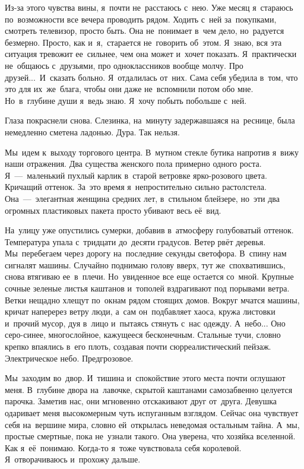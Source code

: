 Из-за этого чувства вины, я~почти не~расстаюсь с~нею.
Уже месяц я~стараюсь по~возможности все вечера проводить рядом.
Ходить с~ней за~покупками, смотреть телевизор, просто быть.
Она не~понимает в~чем дело, но~радуется безмерно.
Просто, как и~я,~старается не~говорить об~этом.
Я~знаю, вся эта ситуация тревожит ее~сильнее, чем она может и~хочет показать.
Я~практически не~общаюсь с~друзьями, про одноклассников вообще молчу.
Про друзей...~И~сказать больно.
Я~отдалилась от~них.
Сама себя убедила в~том, что это для их~же~блага, чтобы они даже не~вспомнили потом обо мне.
Но~в~глубине души я~ведь знаю.
Я~хочу побыть побольше с~ней.

Глаза покраснели снова.
Слезинка, на~минуту задержавшаяся на~реснице, была немедленно сметена ладонью.
Дура.
Так нельзя.

Мы~идем к~выходу торгового центра.
В~мутном стекле бутика напротив я~вижу наши отражения.
Два существа женского пола примерно одного роста.
Я~---~маленький пухлый карлик в~старой ветровке ярко-розового цвета.
Кричащий оттенок.
За~это время я~непростительно сильно растолстела.
Она~---~элегантная женщина средних лет, в~стильном блейзере, но~эти два огромных пластиковых пакета просто убивают весь её~вид.

На~улицу уже опустились сумерки, добавив в~атмосферу голубоватый оттенок.
Температура упала с~тридцати до~десяти градусов.
Ветер рвёт деревья.
Мы~перебегаем через дорогу на~последние секунды светофора.
В~спину нам сигналят машины.
Случайно поднимаю голову вверх, тут же~спохватившись, снова втягиваю ее~в~плечи.
Но~увиденное все еще остается со~мной.
Крупные сочные зеленые листья каштанов и~тополей вздрагивают под порывами ветра.
Ветки нещадно хлещут по~окнам рядом стоящих домов.
Вокруг мчатся машины, кричат наперерез ветру люди, а~сам он~подбавляет хаоса, кружа листовки и~прочий мусор, дуя в~лицо и~пытаясь стянуть с~нас одежду.
А~небо... Оно серо-синее, многослойное, кажущееся бесконечным.
Стальные тучи, словно крепко впаялись в~его плоть, создавая почти сюрреалистический пейзаж.
Электрическое небо.
Предгрозовое.

Мы~заходим во~двор.
И~тишина и~спокойствие этого места почти оглушают меня.
В~глубине двора на~лавочке, скрытой каштанами самозабвенно целуется парочка.
Заметив нас, они мгновенно отскакивают друг от~друга.
Девушка одаривает меня высокомерным чуть испуганным взглядом.
Сейчас она чувствует себя на~вершине мира, словно ей~открылась неведомая остальным тайна.
А~мы, простые смертные, пока не~узнали такого.
Она уверена, что хозяйка вселенной.
Как я~её~понимаю.
Когда-то я~тоже чувствовала себя королевой.
Я~отворачиваюсь и~прохожу дальше.

